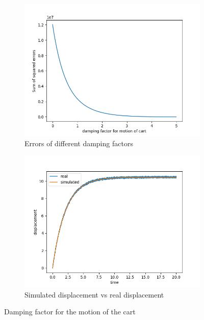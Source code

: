 \documentclass{article}
\begin{document}
\begin{figure}[h]
    \begin{subfigure}[b]{0.5\textwidth}
        \includegraphics[width=\linewidth]{graphs/dc_calibration.png}
        \caption{Errors of different damping factors}
    \end{subfigure}
    \begin{subfigure}[b]{0.5\textwidth}
        \includegraphics[width=\linewidth]{graphs/dc_displacement_error.png}
        \caption{Simulated displacement vs real displacement}
    \end{subfigure}
    \caption{Damping factor for the motion of the cart}
    \label{fig:dc}
\end{figure}
\end{document}
